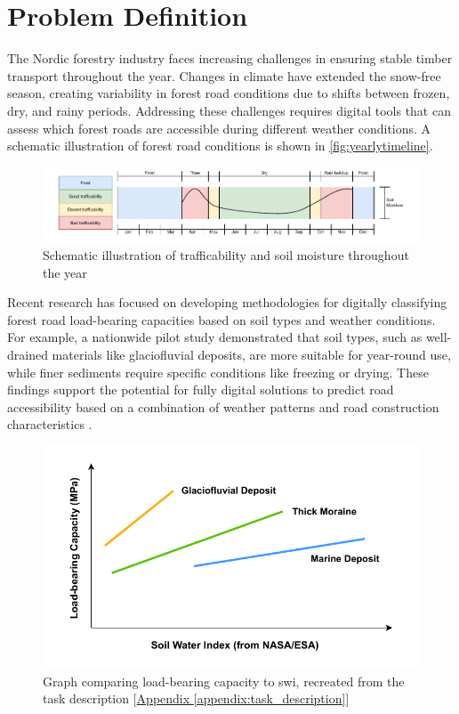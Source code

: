\section{Problem Definition}
The Nordic forestry industry faces increasing challenges in ensuring stable timber transport throughout the year. Changes in climate have extended the snow-free season, creating variability in forest road conditions due to shifts between frozen, dry, and rainy periods. Addressing these challenges requires digital tools that can assess which forest roads are accessible during different weather conditions. A schematic illustration of forest road conditions is shown in \autoref{fig:yearlytimeline}.

\begin{figure}[h]
    \centering
    \centerline{\includegraphics[width=1.3\linewidth]{figures/yearlytimeline.pdf}}
    \caption{Schematic illustration of trafficability and soil moisture throughout the year}
    \label{fig:yearlytimeline}
\end{figure}

Recent research has focused on developing methodologies for digitally classifying forest road load-bearing capacities based on soil types and weather conditions. For example, a nationwide pilot study demonstrated that soil types, such as well-drained materials like \gls{glaciofluvial deposit}s, are more suitable for year-round use, while finer sediments require specific conditions like freezing or drying. These findings support the potential for fully digital solutions to predict road accessibility based on a combination of weather patterns and road construction characteristics \cite{fjeld2023trafficability}.

\begin{figure}[h]
    \centering
    \includegraphics[width=0.7\linewidth]{figures/bæreevne_tørkeindex.pdf}
    \caption[Graph comparing load-bearing capacity to \acrshort{swi}]{Graph comparing load-bearing capacity to \acrshort{swi}, recreated from the task description [\hyperref[appendix:task_description]{Appendix \ref*{appendix:task_description}}]}
    \label{fig:load_to_swi_graph}
\end{figure}

